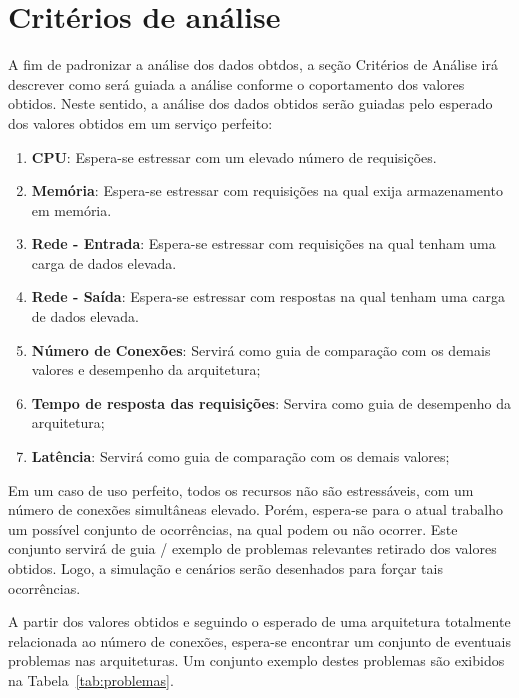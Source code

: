 
\section{Critérios de análise}
\label{sec:criterios}

A fim de padronizar a análise dos dados obtdos, a seção Critérios de Análise irá descrever como será guiada a análise conforme o coportamento dos valores obtidos.
%
Neste sentido, a análise dos dados obtidos serão guiadas pelo esperado dos valores obtidos em um serviço perfeito:

\begin{enumerate}
  \item \textbf{CPU}: Espera-se estressar com um elevado número de requisições.
  \item \textbf{Memória}: Espera-se estressar com requisições na qual exija armazenamento em memória.
  \item \textbf{Rede - Entrada}: Espera-se estressar com requisições na qual tenham uma carga de dados elevada.
  \item \textbf{Rede - Saída}: Espera-se estressar com respostas na qual tenham uma carga de dados elevada.
  \item \textbf{Número de Conexões}: Servirá como guia de comparação com os demais valores e desempenho da arquitetura;
  \item \textbf{Tempo de resposta das requisições}: Servira como guia de desempenho da arquitetura;
  \item \textbf{Latência}: Servirá como guia de comparação com os demais valores;
\end{enumerate}

Em um caso de uso perfeito, todos os recursos não são estressáveis, com um número de conexões simultâneas elevado.
%
Porém, espera-se para o atual trabalho um possível conjunto de ocorrências, na qual podem ou não ocorrer.
%
Este conjunto servirá de guia / exemplo de problemas relevantes retirado dos valores obtidos.
%
Logo, a simulação e cenários serão desenhados para forçar tais ocorrências.


A partir dos valores obtidos e seguindo o esperado de uma arquitetura totalmente relacionada ao número de conexões, espera-se encontrar um conjunto de eventuais problemas nas arquiteturas.
%
Um conjunto exemplo destes problemas são exibidos na Tabela~\ref{tab:problemas}.

